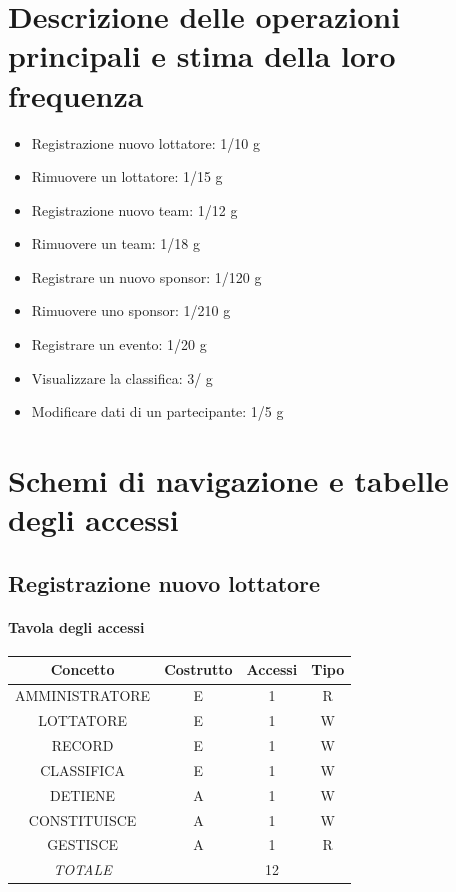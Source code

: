 \documentclass[a4paper,12pt]{report}
\begin{document}
\section{Descrizione delle operazioni principali e stima della loro frequenza}
\begin{itemize}
    \item Registrazione nuovo lottatore: 1/10 g
    \item Rimuovere un lottatore: 1/15 g
    \item Registrazione nuovo team: 1/12 g
    \item Rimuovere un team: 1/18 g
    \item Registrare un nuovo sponsor: 1/120 g
    \item Rimuovere uno sponsor: 1/210 g
    \item Registrare un evento: 1/20 g
    \item Visualizzare la classifica: 3/ g
    \item Modificare dati di un partecipante: 1/5 g
\end{itemize} 

\section{Schemi di navigazione e tabelle degli accessi}
\subsection{Registrazione nuovo lottatore}
\begin{table}[H]
    \paragraph{Tavola degli accessi\newline}
    \begin{tabular}{|c|c|c|c|}
    \hline
    Concetto          & Costrutto & Accessi & Tipo \\ \hline
    AMMINISTRATORE    & E         & 1       & R    \\ \hline
    LOTTATORE         & E         & 1       & W    \\ \hline
    RECORD            & E         & 1       & W    \\ \hline
    CLASSIFICA        & E         & 1       & W    \\ \hline
    DETIENE           & A         & 1       & W    \\ \hline
    CONSTITUISCE      & A         & 1       & W    \\ \hline
    GESTISCE          & A         & 1       & R    \\ \hline
    \textit{TOTALE}   &           & 12       &      \\ \hline
    \end{tabular}
\end{table}
\end{document}
